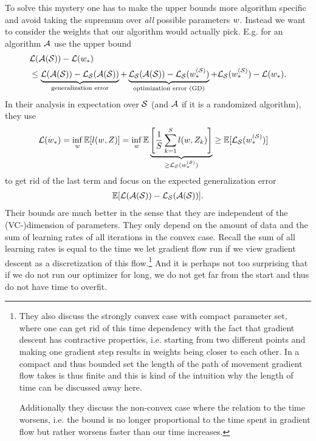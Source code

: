 To solve this mystery one has to make the upper bounds more algorithm specific
and avoid taking the supremum over \emph{all} possible parameters \(w\).
Instead we want to consider the weights that our algorithm would actually pick.
E.g. for an algorithm \(\mathcal{A}\) \textcite{hardtTrainFasterGeneralize2016} use
the upper bound
\begin{align*}
	&\mathcal{L}(\mathcal{A}(\mathcal{S})) - \mathcal{L}(w_*)\\
	&\le \underbrace{\mathcal{L}(\mathcal{A}(\mathcal{S})) - \mathcal{L}_{\mathcal{S}}(\mathcal{A}(\mathcal{S}))}_{
		\text{generalization error}
	}
	+ \underbrace{\mathcal{L}_{\mathcal{S}}(\mathcal{A}(\mathcal{S})) - \mathcal{L}_{\mathcal{S}}(w_*^{(\mathcal{S})})}_{\text{optimization error (GD)}}
	+ \mathcal{L}_{\mathcal{S}}(w_*^{(\mathcal{S})}) - \mathcal{L}(w_*).
\end{align*}
In their analysis in expectation over \(\mathcal{S}\) (and \(\mathcal{A}\) if it is a
randomized algorithm), they use
\begin{align*}
	\mathcal{L}(w_*) &= \inf_{w}\mathbb{E}[l(w, Z)]
	= \inf_{w}\mathbb{E}\underbrace{
		\left[\frac{1}{S}\sum_{k=1}^Sl(w, Z_k)\right]
	}_{\ge \mathcal{L}_{\mathcal{S}}(w_*^{(\mathcal{S})})}
	\ge \mathbb{E}[\mathcal{L}_{\mathcal{S}}(w_*^{(\mathcal{S})})]
\end{align*}
to get rid of the last term and focus on the expected generalization error
\begin{align*}
	\mathbb{E}[\mathcal{L}(\mathcal{A}(\mathcal{S})) - \mathcal{L}_{\mathcal{S}}(\mathcal{A}(\mathcal{S}))].
\end{align*}
Their bounds are much better in the sense that they are independent of
the (VC-)dimension of parameters. They only depend on the amount of data and
the sum of learning rates of all iterations in the convex case. Recall the sum of
all learning rates is equal to the time we let gradient flow run if we view
gradient descent as a discretization of this flow.\footnote{
	They also discuss the strongly convex case with compact parameter set, where
	one can get rid of this time dependency with the fact that gradient descent
	has contractive properties, i.e. starting from two different points and
	making one gradient step results in weights being closer to each other. 
	In a compact and thus bounded set the length of the path of movement gradient
	flow takes is thus finite and this is kind of the intuition why the length
	of time can be discussed away here.

	Additionally they discuss the non-convex case where the relation to the time worsens,
	i.e. the bound is no longer proportional to the time spent in gradient flow
	but rather worsens faster than our time increases.
} And it is perhaps not too surprising that if we
do not run our optimizer for long, we do not get far from the start and thus
do not have time to overfit.

